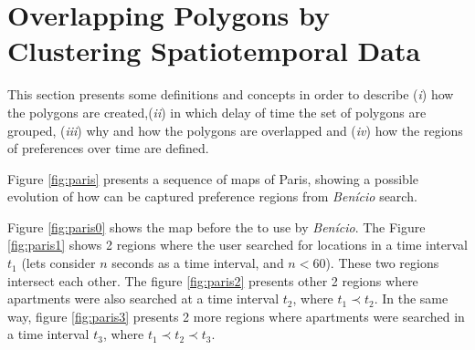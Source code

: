 \documentclass[runningheads,a4paper]{llncs}
\begin{document}



\section{Overlapping Polygons by Clustering Spatiotemporal Data}
\label{sec:overpolygons}

This section presents some definitions and concepts in order to describe (\textit{i}) how the polygons are created,(\textit{ii}) in which delay of time the set of polygons are grouped, (\textit{iii})  why and how the polygons are overlapped and  (\textit{iv}) how the regions of preferences over time are defined.



Figure \ref{fig:paris} presents a sequence of maps of Paris, showing a possible  evolution of how can be captured preference regions from \textit{Ben\'icio} search.

Figure \ref{fig:paris0} shows the map before the to use by  \textit{Ben\'icio}. The Figure \ref{fig:paris1} shows 2 regions where the user searched for locations in a time interval $t_1$ (lets consider $n$ seconds as a time interval, and $n < 60$). These two regions intersect each other. The figure \ref{fig:paris2} presents other 2 regions where apartments were also searched at a time interval $t_2$, where $t_1 \prec t_2$. In the same way, figure \ref{fig:paris3}  presents 2 more regions where apartments were searched in a time interval $t_3$, where $t_1 \prec t_2 \prec t_ 3$.
\end{document}
